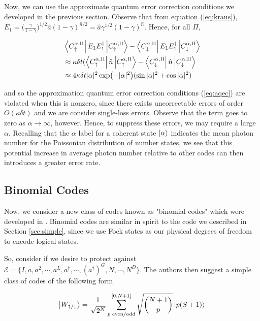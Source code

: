 \documentclass[12]{amsart}
\newcommand\0{\mathbf{0}}
\newcommand\<{\langle}
\renewcommand\>{\rangle}
\begin{document}
Now, we can use the approximate quantum error correction conditions we developed in the previous section. Observe that from equation (\ref{eq:kraus}), $E_1 = \Big(\frac{\gamma}{1-\gamma}\Big)^{1 / 2} \hat{a} (1 - \gamma)^{\hat{n} / 2} = \hat{a} \gamma^{1/2} (1- \gamma)^{\hat{n}}$. Hence, for all $\Pi$,

\begin{align*}
&\bra{C^{\alpha, \Pi}_{\uparrow}}E_1E_1^\dag\ket{C^{\alpha, \Pi}_{\uparrow}} - \bra{C^{\alpha, \Pi}_{\downarrow}}	E_1E_1^\dag\ket{C^{\alpha, \Pi}_{\downarrow}}	\\
&\approx \kappa\delta t (\bra{C^{\alpha, \Pi}_{\uparrow}}\hat{n}\ket{C^{\alpha, \Pi}_{\uparrow}} - \bra{C^{\alpha, \Pi}_{\downarrow}}	\hat{n}\ket{C^{\alpha, \Pi}_{\downarrow}}\\
&\approx 4 \kappa \delta t |\alpha|^2  \exp(-|\alpha|^2)(\sin |\alpha|^2 + \cos|\alpha|^2)
\end{align*}

and so the approximation quantum error correction conditions (\ref{eq:aqec}) are violated when this is nonzero, since there exists uncorrectable errors of order $O(\kappa \delta t)$ and we are consider single-loss errors. Observe that the term goes to zero as $\alpha\rightarrow \infty$, however. Hence, to suppress these errors, we may require a large $\alpha$. Recalling that the $\alpha$ label for a coherent state $\ket{\alpha}$ indicates the mean photon number for the Poissonian distribution of number states, we see that this potential increase in average photon number relative to other codes can then introduces a greater error rate.

\subsection{Binomial Codes}

Now, we consider a new class of codes known as "binomial codes" which were developed in  \cite{michael2016new}. Binomial codes are similar in spirit to the code we described in Section \ref{sec:simple}, since we use Fock states as our physical degrees of freedom to encode logical states.


So, consider if we desire to protect against $\mathcal{E} = \{I, a, a^2, \cdots, a^L, a^\dag, \cdots, (a^\dag)^G, N, \cdots, N^D \}$. The authors then suggest a simple class of codes of the following form

$$
\ket{W_{\uparrow / \downarrow}} = \frac{1}{\sqrt{2^N}} \sum_{ p\text{ even/odd}}^{[0, N+1]} \sqrt{\binom{N+1}{ p }} \ket{p(S+1)}
$$
\end{document}
